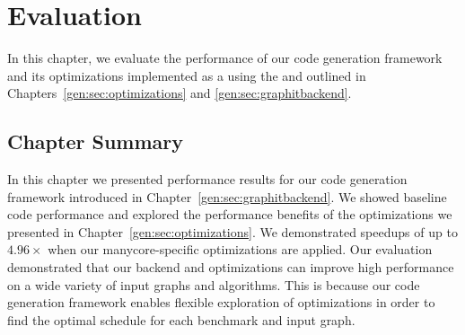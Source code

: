\chapter{Evaluation}\label{sec:eval}

In this chapter, we evaluate the performance of our code generation framework and its optimizations implemented as a \graphvm using the \ugc and outlined in Chapters~\ref{gen:sec:optimizations} and \ref{gen:sec:graphitbackend}.




\section{Chapter Summary}

In this chapter we presented performance results for our code generation framework introduced in Chapter~\ref{gen:sec:graphitbackend}.
We showed baseline code performance and explored the performance benefits of the optimizations we presented in Chapter~\ref{gen:sec:optimizations}.
We demonstrated speedups of up to $4.96\times$ when our manycore-specific optimizations are applied.
Our evaluation demonstrated that our \graphit backend and optimizations can improve high performance on a wide variety of input graphs and algorithms.
This is because our code generation framework enables flexible exploration of optimizations in order to find the optimal schedule for each benchmark and input graph.